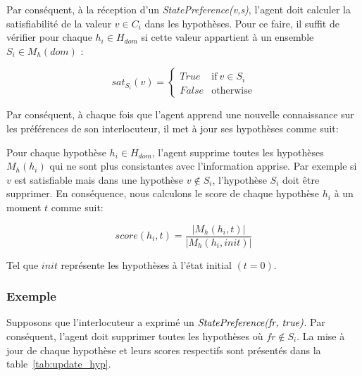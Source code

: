 Par conséquent, à la réception d'un \emph{StatePreference(v,s)}, l'agent doit calculer la satisfiabilité de la valeur  $v \in C_i$ dans les hypothèses. Pour ce faire, il suffit de vérifier pour chaque $h_i \in H_{dom}$ si cette valeur appartient à un ensemble $S_i \in M_h(dom)$ :


\begin{equation}
sat_{S_i}(v)= \left\{\begin{array}{ll}
True	 & \mathrm{if\ }  v \in S_i\\
False & \mathrm{otherwise}
\end{array}\right.
\end{equation}

Par conséquent, à chaque fois que l'agent apprend une nouvelle connaissance sur les préférences de son interlocuteur, il met à jour ses hypothèses comme suit: 

Pour chaque hypothèse $h_i \in H_{dom}$, l'agent supprime toutes les hypothèses $M_h(h_i)$ qui ne sont plus consistantes avec l'information apprise. Par exemple si $v$ est satisfiable mais dans une hypothèse $v \not \in S_i$, l'hypothèse $S_i$ doit être supprimer.
En conséquence, nous calculons le score de chaque hypothèse $h_i$ à un moment $t$ comme suit: 

$$score(h_i,t) = \frac{|M_h(h_i, t)|}{|M_h(h_i, init)|}$$

Tel que $init$ représente les hypothèses à l'état initial $(t=0)$.

\subsubsection{Exemple}
Supposons que l'interlocuteur a exprimé un  $\emph{StatePreference(fr, true)}$. Par conséquent, l'agent doit supprimer toutes les hypothèses où $fr\not\in S_i$. La mise à jour de chaque hypothèse et leurs scores respectifs sont présentés dans la table~\ref{tab:update_hyp}. 

